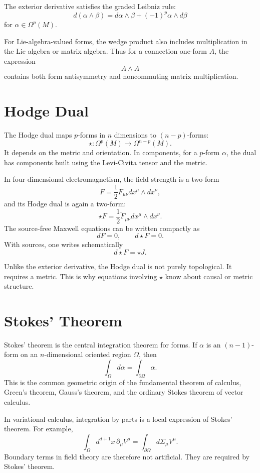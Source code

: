 The exterior derivative satisfies the graded Leibniz rule:
\[
    d(\alpha\wedge\beta)=d\alpha\wedge\beta+(-1)^p\alpha\wedge d\beta
\]
for \(\alpha\in\Omega^p(M)\).

For Lie-algebra-valued forms, the wedge product also includes multiplication in
the Lie algebra or matrix algebra. Thus for a connection one-form \(A\), the
expression
\[
    A\wedge A
\]
contains both form antisymmetry and noncommuting matrix multiplication.

\section{Hodge Dual}

The Hodge dual maps \(p\)-forms in \(n\) dimensions to \((n-p)\)-forms:
\[
    \star:\Omega^p(M)\to\Omega^{n-p}(M).
\]
It depends on the metric and orientation. In components, for a \(p\)-form
\(\alpha\), the dual has components built using the Levi-Civita tensor and the
metric.

In four-dimensional electromagnetism, the field strength is a two-form
\[
    F=\frac{1}{2}F_{\mu\nu}dx^\mu\wedge dx^\nu,
\]
and its Hodge dual is again a two-form:
\[
    \star F=\frac{1}{2}\widetilde{F}_{\mu\nu}dx^\mu\wedge dx^\nu.
\]
The source-free Maxwell equations can be written compactly as
\[
    dF=0,
    \qquad
    d\star F=0.
\]
With sources, one writes schematically
\[
    d\star F=\star J.
\]

\begin{remarkbox}
Unlike the exterior derivative, the Hodge dual is not purely topological. It
requires a metric. This is why equations involving \(\star\) know about causal
or metric structure.
\end{remarkbox}

\section{Stokes' Theorem}

Stokes' theorem is the central integration theorem for forms. If \(\alpha\) is
an \((n-1)\)-form on an \(n\)-dimensional oriented region \(\Omega\), then
\[
    \int_\Omega d\alpha=\int_{\partial\Omega}\alpha.
\]
This is the common geometric origin of the fundamental theorem of calculus,
Green's theorem, Gauss's theorem, and the ordinary Stokes theorem of vector
calculus.

In variational calculus, integration by parts is a local expression of Stokes'
theorem. For example,
\[
    \int_\Omega d^{d+1}x\,\partial_\mu V^\mu
    =\int_{\partial\Omega}d\Sigma_\mu V^\mu.
\]
Boundary terms in field theory are therefore not artificial. They are required
by Stokes' theorem.

